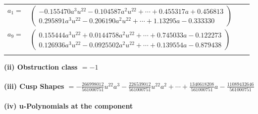 \documentclass[1p]{elsarticle_modified}
\theoremstyle{definition}
\begin{document}
\begin{tabular}{m{7pt} m{180pt} m{7pt} m{180pt} }
\flushright $a_{1}=$&$\begin{pmatrix}-0.155470 a^{3} u^{22}-0.104587 a^{2} u^{22}+\cdots+0.455317 a+0.456813\\0.295891 a^{3} u^{22}-0.206190 a^{2} u^{22}+\cdots+1.13295 a-0.333330\end{pmatrix}$ \\
\flushright $a_{9}=$&$\begin{pmatrix}0.155444 a^{3} u^{22}+0.0144758 a^{2} u^{22}+\cdots+0.745033 a-0.122273\\0.126936 a^{3} u^{22}-0.0925502 a^{2} u^{22}+\cdots+0.139554 a-0.879438\end{pmatrix}$\\&\end{tabular}
\flushleft \textbf{(ii) Obstruction class $= -1$}\\~\\
\flushleft \textbf{(iii) Cusp Shapes $= -\frac{266998012}{561000751} u^{22} a^3-\frac{226539012}{561000751} u^{22} a^2+\cdots+\frac{1340618208}{561000751} a-\frac{11089432646}{561000751}$}\\~\\
\newpage\renewcommand{\arraystretch}{1}
\flushleft \textbf{(iv) u-Polynomials at the component}\newline \\
\end{document}
